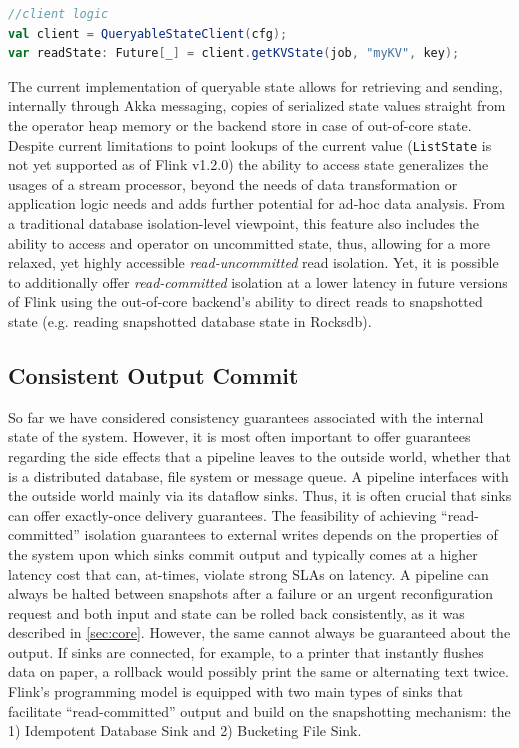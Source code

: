 \begin{lstlisting}[language=scala]
//client logic
val client = QueryableStateClient(cfg);
var readState: Future[_] = client.getKVState(job, "myKV", key);
\end{lstlisting}
The current implementation of queryable state allows for retrieving and sending, internally through Akka messaging, copies of serialized state values straight from the operator heap memory or the backend store in case of out-of-core state. Despite current limitations to point lookups of the current value (\texttt{ListState} is not yet supported as of Flink v1.2.0) the ability to access state generalizes the usages of a stream processor, beyond the needs of data transformation or application logic needs and adds further potential for ad-hoc data analysis. From a traditional database isolation-level viewpoint, this feature also includes the ability to access and operator on uncommitted state, thus, allowing for a more relaxed, yet highly accessible \emph{read-uncommitted} read isolation. Yet, it is possible to additionally offer \emph{read-committed} isolation at a lower latency in future versions of Flink using the out-of-core backend's ability to direct reads to snapshotted state (e.g. reading snapshotted database state in Rocksdb). 


\subsection{Consistent Output Commit}
\label{sec:outputcommit}

So far we have considered consistency guarantees associated with the internal state of the system. However, it is most often important to offer guarantees regarding the side effects that a pipeline leaves to the outside world, whether that is a distributed database, file system or message queue. A pipeline interfaces with the outside world mainly via its dataflow sinks. Thus, it is often crucial that sinks can offer exactly-once delivery guarantees. The feasibility of achieving ``read-committed'' isolation guarantees to external writes depends on the properties of the system upon which sinks commit output and typically comes at a higher latency cost that can, at-times, violate strong SLAs on latency. A pipeline can always be halted between snapshots after a failure or an urgent reconfiguration request and both input and state can be rolled back consistently, as it was described in \ref{sec:core}. However, the same cannot always be guaranteed about the output. If sinks are connected, for example, to a printer that instantly flushes data on paper, a rollback would possibly print the same or alternating text twice. Flink's programming model is equipped with two main types of sinks that facilitate ``read-committed'' output and build on the snapshotting mechanism: the 1) Idempotent Database Sink and 2) Bucketing File Sink.

